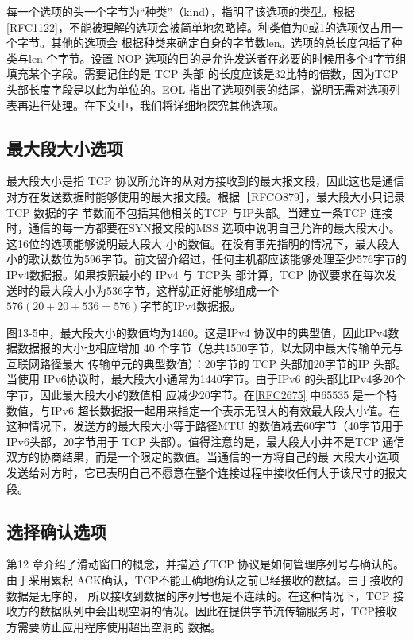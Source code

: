 每一个选项的头一个字节为“种类”（kind），指明了该选项的类型。根据\href{https://www.rfc-editor.org/rfc/rfc1122}{[RFC1122]}，不能被理解的选项会被简单地忽略掉。种类值为0或1的选项仅占用一个字节。其他的选项会
根据种类来确定自身的字节数len。选项的总长度包括了种类与len 个字节。设置 NOP
选项的目的是允许发送者在必要的时候用多个4字节组填充某个字段。需要记住的是 TCP 头部
的长度应该是32比特的倍数，因为TCP 头部长度字段是以此为单位的。EOL
指出了选项列表的结尾，说明无需对选项列表再进行处理。在下文中，我们将详细地探究其他选项。

\subsection{最大段大小选项}
最大段大小是指 TCP
协议所允许的从对方接收到的最大报文段，因此这也是通信对方在发送数据时能够使用的最大报文段。根据［RFCO879］，最大段大小只记录 TCP 数据的字
节数而不包括其他相关的TCP 与IP头部。当建立一条TCP 连接时，通信的每一方都要在SYN报文段的MSS
选项中说明自己允许的最大段大小。这16位的选项能够说明最大段大
小的数值。在没有事先指明的情况下，最大段大小的歌认数位为596字节。前文留介绍过，任何主机都应该能够处理至少576字节的IPv4数据报。如果按照最小的
IPv4 与 TCP头
部计算，TCP 协议要求在每次发送时的最大段大小为536字节，这样就正好能够组成一个$576(20+20+536= 576)$字节的IPv4数据报。

图13-5中，最大段大小的数值均为1460。这是IPv4 协议中的典型值，因此IPv4数据数据报的大小也相应增加 40
个字节（总共1500字节，以太网中最大传输单元与互联网路径最大
传输单元的典型数值）：20字节的 TCP 头部加20字节的IP 头部。当使用 IPv6协议时，最大段大小通常为1440字节。由于IPv6
的头部比IPv4多20个字节，因此最大段大小的数值相
应减少20字节。在\href{https://www.rfc-editor.org/rfc/rfc2675}{[RFC2675]}
中65535 是一个特数值，与IPv6 超长数据报一起用来指定一个表示无限大的有效最大段大小值。在这种情况下，发送方的最大段大小等于路径MTU
的数值减去60字节（40字节用于IPv6头部，20字节用于 TCP 头部）。值得注意的是，最大段大小并不是TCP
通信双方的协商结果，而是一个限定的数值。当通信的一方将自己的最
大段大小选项发送给对方时，它已表明自己不愿意在整个连接过程中接收任何大于该尺寸的报文段。

\subsection{选择确认选项}
第12 章介绍了滑动窗口的概念，并描述了TCP 协议是如何管理序列号与确认的。由于采用累积
ACK确认，TCP不能正确地确认之前已经接收的数据。由于接收的数据是无序的，
所以接收到数据的序列号也是不连续的。在这种情况下，TCP
接收方的数据队列中会出现空洞的情况。因此在提供字节流传输服务时，TCP接收方需要防止应用程序使用超出空洞的
数据。

